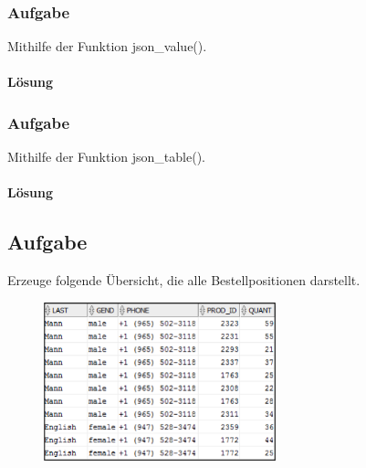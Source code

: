 \subsubsection{Aufgabe}
\label{subsec:uebung_10.aufgabe_01a}
Mithilfe der Funktion json\_value().

\paragraph*{Lösung}
\label{subsubsec:uebung_10.aufgabe_01a.loesung}


\subsubsection{Aufgabe}
\label{subsec:uebung_10.aufgabe_01b}
Mithilfe der Funktion json\_table().

\paragraph*{Lösung}
\label{subsubsec:uebung_10.aufgabe_01b.loesung}


\subsection{Aufgabe}
\label{subsec:uebung_10.aufgabe_02}
Erzeuge folgende Übersicht, die alle Bestellpositionen darstellt.

\begin{figure}[H]
  \centering
  \includegraphics[width=0.6\textwidth]{img//uebung_10_-_aufgabe_02.png}
  \label{img:uebung_10_-_aufgabe_02}
\end{figure}

